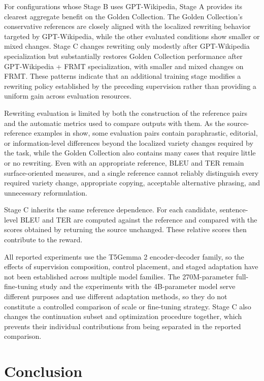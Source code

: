 \documentclass[acmtog,nonacm]{acmart}
\begin{document}
For configurations whose Stage B uses GPT-Wikipedia, Stage A provides its clearest aggregate benefit on the Golden Collection. The Golden Collection’s conservative references are closely aligned with the localized rewriting behavior targeted by GPT-Wikipedia, while the other evaluated conditions show smaller or mixed changes. Stage C changes rewriting only modestly after GPT-Wikipedia specialization but substantially restores Golden Collection performance after GPT-Wikipedia + FRMT specialization, with smaller and mixed changes on FRMT. These patterns indicate that an additional training stage modifies a rewriting policy established by the preceding supervision rather than providing a uniform gain across evaluation resources.

Rewriting evaluation is limited by both the construction of the reference pairs and the automatic metrics used to compare outputs with them. As the source-reference examples in  show, some evaluation pairs contain paraphrastic, editorial, or information-level differences beyond the localized variety changes required by the task, while the Golden Collection also contains many cases that require little or no rewriting. Even with an appropriate reference, BLEU and TER remain surface-oriented measures, and a single reference cannot reliably distinguish every required variety change, appropriate copying, acceptable alternative phrasing, and unnecessary reformulation.

Stage C inherits the same reference dependence. For each candidate, sentence-level BLEU and TER are computed against the reference and compared with the scores obtained by returning the source unchanged. These relative scores then contribute to the reward.

All reported experiments use the T5Gemma 2 encoder-decoder family, so the effects of supervision composition, control placement, and staged adaptation have not been established across multiple model families. The 270M-parameter full-fine-tuning study and the experiments with the 4B-parameter model serve different purposes and use different adaptation methods, so they do not constitute a controlled comparison of scale or fine-tuning strategy. Stage C also changes the continuation subset and optimization procedure together, which prevents their individual contributions from being separated in the reported comparison.

\section{Conclusion}
\label{sec:conclusion}
\end{document}
